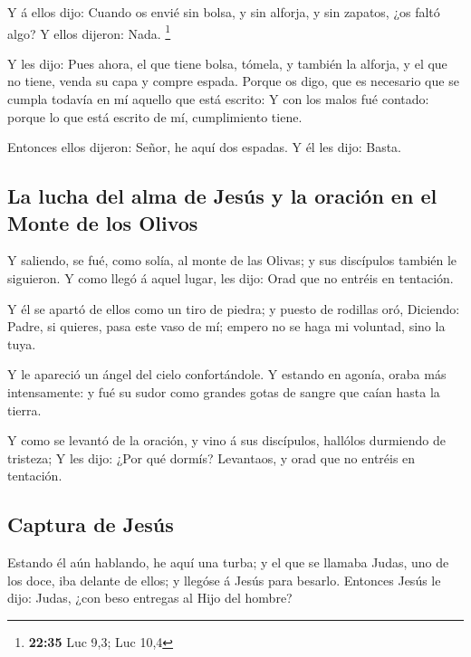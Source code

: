 Y á ellos dijo: Cuando os envié sin bolsa, y sin alforja,
y sin zapatos, ¿os faltó algo? Y ellos dijeron: Nada. \footnote{\textbf{22:35}
  Luc 9,3; Luc 10,4}

 Y les dijo: Pues ahora, el que tiene bolsa, tómela, y
también la alforja, y el que no tiene, venda su capa y compre espada.
 Porque os digo, que es necesario que se cumpla todavía en
mí aquello que está escrito: Y con los malos fué contado: porque lo que
está escrito de mí, cumplimiento tiene.

 Entonces ellos dijeron: Señor, he aquí dos espadas. Y él
les dijo: Basta.

\hypertarget{la-lucha-del-alma-de-jesuxfas-y-la-oraciuxf3n-en-el-monte-de-los-olivos}{%
\subsection{La lucha del alma de Jesús y la oración en el Monte de los
Olivos}\label{la-lucha-del-alma-de-jesuxfas-y-la-oraciuxf3n-en-el-monte-de-los-olivos}}

 Y saliendo, se fué, como solía, al monte de las Olivas; y
sus discípulos también le siguieron.  Y como llegó á aquel
lugar, les dijo: Orad que no entréis en tentación.

 Y él se apartó de ellos como un tiro de piedra; y puesto
de rodillas oró,  Diciendo: Padre, si quieres, pasa este
vaso de mí; empero no se haga mi voluntad, sino la tuya.

 Y le apareció un ángel del cielo confortándole.
 Y estando en agonía, oraba más intensamente: y fué su
sudor como grandes gotas de sangre que caían hasta la tierra.

 Y como se levantó de la oración, y vino á sus discípulos,
hallólos durmiendo de tristeza;  Y les dijo: ¿Por qué
dormís? Levantaos, y orad que no entréis en tentación.

\hypertarget{captura-de-jesuxfas}{%
\subsection{Captura de Jesús}\label{captura-de-jesuxfas}}

 Estando él aún hablando, he aquí una turba; y el que se
llamaba Judas, uno de los doce, iba delante de ellos; y llegóse á Jesús
para besarlo.  Entonces Jesús le dijo: Judas, ¿con beso
entregas al Hijo del hombre?

